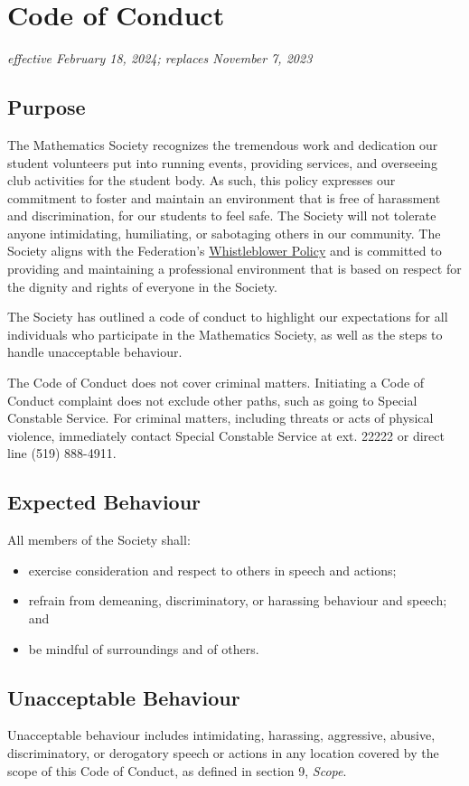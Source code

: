 \section{Code of Conduct}
\emph{effective February 18, 2024; replaces November 7, 2023}\\

\subsection{Purpose}
The Mathematics Society recognizes the tremendous work and dedication our student volunteers put into running events, providing services, and overseeing club activities for the student body. As such, this policy expresses our commitment to foster and maintain an environment that is free of harassment and discrimination, for our students to feel safe. The Society will not tolerate anyone intimidating, humiliating, or sabotaging others in our community. The Society aligns with the Federation's \href{https://wusa.ca/document/whistleblower-policy/}{Whistleblower Policy} and is committed to providing and maintaining a professional environment that is based on respect for the dignity and rights of everyone in the Society.

The Society has outlined a code of conduct to highlight our expectations for all individuals who participate in the Mathematics Society, as well as the steps to handle unacceptable behaviour.

The Code of Conduct does not cover criminal matters. Initiating a Code of Conduct complaint does not exclude other paths, such as going to Special Constable Service. For criminal matters, including threats or acts of physical violence, immediately contact Special Constable Service at ext. 22222 or direct line (519) 888-4911.

\subsection{Expected Behaviour}
All members of the Society shall:
\begin{itemize}
	\item exercise consideration and respect to others in speech and actions;
	\item refrain from demeaning, discriminatory, or harassing behaviour and speech; and
	\item be mindful of surroundings and of others.
\end{itemize}

\subsection{Unacceptable Behaviour}
Unacceptable behaviour includes intimidating, harassing, aggressive, abusive, discriminatory, or derogatory speech or actions in any location covered by the scope of this Code of Conduct, as defined in section 9, \textit{Scope}.

